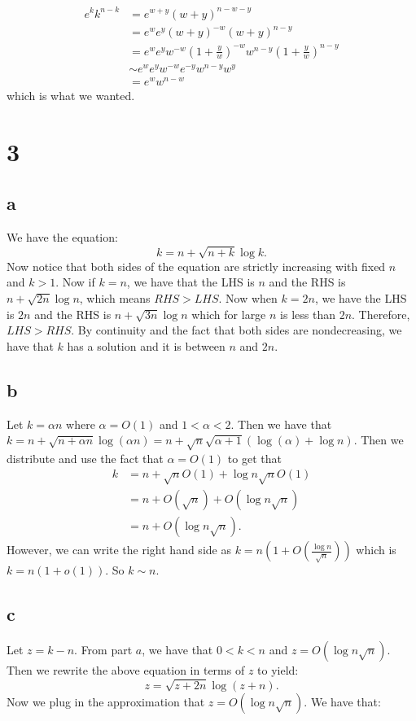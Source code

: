 \documentclass[]{article}
\begin{document}
\begin{align*}
	e^k k^{n - k} &= e^{w + y}(w + y)^{n - w - y}\\
	&=e^w e^y (w + y)^{-w} (w + y)^{n - y}\\
	&= e^w e^y w^{-w} \left(1 + \frac{y}{w}\right)^{- w}  w^{n - y}   \left(1 + \frac{y}{w}\right)^{n - y}\\
	&\sim e^w e^y w^{-w} e^{-y}  w^{n - y} w^y\\
	&= e^w w^{n - w}
\end{align*}
which is what we wanted. 
\section{3}
\subsection{a}
We have the equation:
\begin{equation}
	k = n + \sqrt{n + k} \log k.
\end{equation}
Now notice that both sides of the equation are strictly increasing with fixed $n$ and $k > 1$. Now if $k = n$, we have that the LHS is $n$ and the RHS is $n + \sqrt{2n} \log n$, which means $RHS > LHS$. Now when $k = 2n$, we have the LHS is $2n$ and the RHS is $n + \sqrt{3n} \log n$ which for large $n$ is less than $2n$. Therefore, $LHS > RHS$. By continuity and the fact that both sides are nondecreasing, we have that $k$ has a solution and it is between $n$ and $2n$. 
\subsection{b}
Let $k = \alpha n$ where $\alpha = O(1)$ and $1 < \alpha < 2$. 
Then we have that 
$k = n + \sqrt{n + \alpha n} \log (\alpha n) = n + \sqrt{n} \sqrt{\alpha + 1} (\log(\alpha) + \log n)$. Then we distribute and use the fact that $\alpha = O(1)$ to get that
\begin{align*}
	k &= n + \sqrt{n} O(1) + \log n \sqrt{n} O(1)\\
	 &= n + O(\sqrt{n}) + O(\log n \sqrt{n})\\
	 &= n + O(\log n \sqrt n).
\end{align*}
However, we can write the right hand side as $k = n(1 + O(\frac{\log n}{\sqrt{n}}))$ which is $k = n(1 + o(1))$. So $k \sim n$. 
\subsection{c}
Let $z = k - n$. From part $a$, we have that $0 < k < n$ and $z =  O(\log n \sqrt n)$. Then we rewrite the above equation in terms of $z$ to yield:
\begin{equation}
	z = \sqrt{z + 2n} \log (z + n).
\end{equation}
Now we plug in the approximation that $z = O(\log n \sqrt{n})$. We have that:
\end{document}
